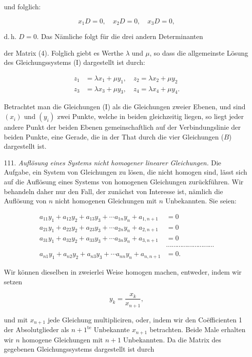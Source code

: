 \documentclass[11pt]{article}
\providecommand{\weberpage}[1]{}
\providecommand{\weq}[2]{\begin{equation}\tag{#1}#2\end{equation}}
\begin{document}
und folglich:

\[ x_1D=0,\quad x_2D=0,\quad x_3D=0, \]

d.\,h. $D=0$. Das Nämliche folgt für die drei andern Determinanten


\weberpage{117}

der Matrix (4). Folglich giebt es Werthe $\lambda$ und $\mu$, so dass die allgemeinste Lösung des Gleichungssystems (I) dargestellt ist durch:

\weq{B}{\begin{aligned} z_1&=\lambda x_1+\mu y_1,\quad z_2=\lambda x_2+\mu y_2\\ z_3&=\lambda x_3+\mu y_3,\quad z_4=\lambda x_4+\mu y_4. \end{aligned}}

Betrachtet man die Gleichungen (I) als die Gleichungen zweier Ebenen, und sind $(x_i)$ und $(y_i)$ zwei Punkte, welche in beiden gleichzeitig liegen, so liegt jeder andere Punkt der beiden Ebenen gemeinschaftlich auf der Verbindungslinie der beiden Punkte, eine Gerade, die in der That durch die vier Gleichungen ($B$) dargestellt ist.

111. \textit{Auflösung eines Systems nicht homogener linearer Gleichungen.} Die Aufgabe, ein System von Gleichungen zu lösen, die nicht homogen sind, lässt sich auf die Auflösung eines Systems von homogenen Gleichungen zurückführen. Wir behandeln daher nur den Fall, der zunächst von Interesse ist, nämlich die Auflösung von $n$ nicht homogenen Gleichungen mit $n$ Unbekannten. Sie seien:

\[ \begin{aligned}
a_{11}y_1+a_{12}y_2+a_{13}y_3+\cdots a_{1n}y_n+a_{1,n+1}&=0\\
a_{21}y_1+a_{22}y_2+a_{23}y_3+\cdots a_{2n}y_n+a_{2,n+1}&=0\\
a_{31}y_1+a_{32}y_2+a_{33}y_3+\cdots a_{3n}y_n+a_{3,n+1}&=0\\
&\cdots\cdots\cdots\cdots\cdots\cdots\cdots\cdots\cdots\\
a_{n1}y_1+a_{n2}y_2+a_{n3}y_3+\cdots a_{nn}y_n+a_{n,n+1}&=0.
\end{aligned} \]

Wir können dieselben in zweierlei Weise homogen machen, entweder, indem wir setzen

\[ y_k = \frac{x_k}{x_{n+1}}, \]

und mit $x_{n+1}$ jede Gleichung multipliciren, oder, indem wir den Co\"efficienten 1 der Absolutglieder als $n+1^{\text{te}}$ Unbekannte $x_{n+1}$ betrachten. Beide Male erhalten wir $n$ homogene Gleichungen mit $n+1$ Unbekannten. Da die Matrix des gegebenen Gleichungssystems dargestellt ist durch
\end{document}
